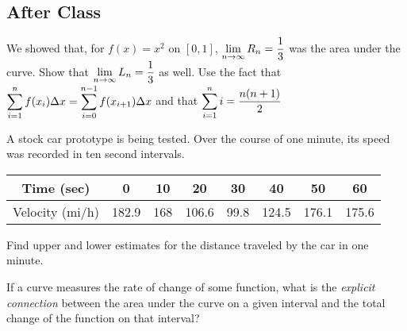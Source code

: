 \documentclass[notes]{subfiles}
\begin{document}
	\subsection*{After Class}
		\begin{ex}
			We showed that, for $f(x) = x^2$ on $[0,1]$, $\displaystyle \lim_{n\to \infty} R_n = \dfrac{1}{3}$ was the area under the curve.  Show that $\displaystyle \lim_{n\to \infty} L_n = \dfrac{1}{3}$ as well.  Use the fact that $\displaystyle \sum_{i=1}^n f(x_i)\Delta x = \sum_{i=0}^{n-1} f(x_{i+1})\Delta x$ and that $\displaystyle \sum_{i=1}^n i =\dfrac{n(n+1)}{2}$
		\end{ex}
			
		\begin{ex}
			A stock car prototype is being tested.  Over the course of one minute, its speed was recorded in ten second intervals.
			\begin{center}
				{\renewcommand{\arraystretch}{1.2}
				\begin{tabular}{|c|c|c|c|c|c|c|c|} \hline
					Time (sec) & 0 & 10 & 20 & 30 & 40 & 50 & 60 \\ \hline
					Velocity (mi/h) & 182.9 & 168 & 106.6 & 99.8 & 124.5 & 176.1 & 175.6\\ \hline
				\end{tabular}
				}
			\end{center}
			Find upper and lower estimates for the distance traveled by the car in one minute.
		\end{ex}
			\newpage
			
		\begin{ex}
			If a curve measures the rate of change of some function, what is the \emph{explicit connection} between the area under the curve on a given interval and the total change of the function on that interval?
		\end{ex}
	\clearpage
\end{document}
